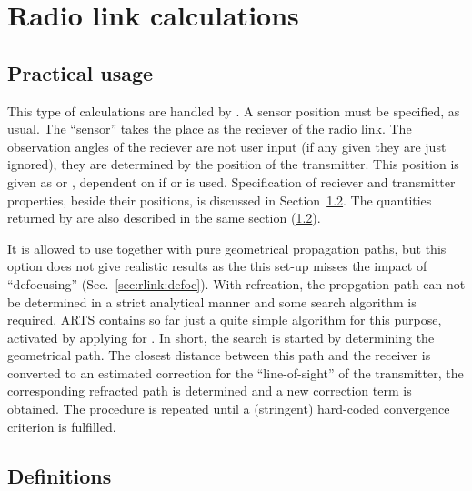 \section{Radio link calculations}
\label{sec:radiolinks}

\subsection{Practical usage}
%
This type of calculations are handled by . A sensor
position must be specified, as usual. The ``sensor'' takes the place as the
reciever of the radio link. The observation angles of the reciever are not user
input (if any given they are just ignored), they are determined by the position
of the transmitter. This position is given as  or
, dependent on if  or 
is used. Specification of reciever and transmitter properties, beside their
positions, is discussed in Section~\ref{sec:radiolinks:oview}. The quantities
returned by  are also described in the same section
(\ref{sec:radiolinks:oview}).

It is allowed to use  together with pure geometrical
propagation paths, but this option does not give realistic results as the this
set-up misses the impact of ``defocusing'' (Sec.~\ref{sec:rlink:defoc}). With
refrcation, the propgation path can not be determined in a strict analytical
manner and some search algorithm is required. ARTS contains so far just a quite
simple algorithm for this purpose, activated by applying
 for . In short, the search
is started by determining the geometrical path. The closest distance between
this path and the receiver is converted to an estimated correction for the
``line-of-sight'' of the transmitter, the corresponding refracted path is
determined and a new correction term is obtained. The procedure is repeated
until a (stringent) hard-coded convergence criterion is fulfilled.

   
\subsection{Definitions}
\label{sec:radiolinks:oview}


